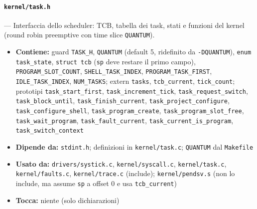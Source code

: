 \paragraph{\texttt{kernel/task.h}} --- Interfaccia dello scheduler: TCB, tabella dei task, stati e funzioni del kernel (round robin preemptive con time slice \texttt{QUANTUM}).
\begin{itemize}
  \item \textbf{Contiene:} guard \texttt{TASK\_H}, \texttt{QUANTUM} (default 5, ridefinito da \texttt{-DQUANTUM}), \texttt{enum task\_state}, \texttt{struct tcb} (\texttt{sp} deve restare il primo campo), \texttt{PROGRAM\_SLOT\_COUNT}, \texttt{SHELL\_TASK\_INDEX}, \texttt{PROGRAM\_TASK\_FIRST}, \texttt{IDLE\_TASK\_INDEX}, \texttt{NUM\_TASKS}; extern \texttt{tasks}, \texttt{tcb\_current}, \texttt{tick\_count}; prototipi \texttt{task\_start\_first}, \texttt{task\_increment\_tick}, \texttt{task\_request\_switch}, \texttt{task\_block\_until}, \texttt{task\_finish\_current}, \texttt{task\_project\_configure}, \texttt{task\_configure\_shell}, \texttt{task\_program\_create}, \texttt{task\_program\_slot\_free}, \texttt{task\_wait\_program}, \texttt{task\_fault\_current}, \texttt{task\_current\_is\_program}, \texttt{task\_switch\_context}
  \item \textbf{Dipende da:} \texttt{stdint.h}; definizioni in \texttt{kernel/task.c}; \texttt{QUANTUM} dal \texttt{Makefile}
  \item \textbf{Usato da:} \texttt{drivers/systick.c}, \texttt{kernel/syscall.c}, \texttt{kernel/task.c}, \texttt{kernel/faults.c}, \texttt{kernel/trace.c} (include); \texttt{kernel/pendsv.s} (non lo include, ma assume \texttt{sp} a offset 0 e usa \texttt{tcb\_current})
  \item \textbf{Tocca:} niente (solo dichiarazioni)
\end{itemize}

